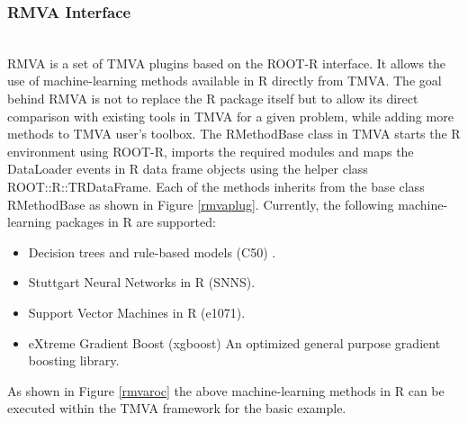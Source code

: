 \documentclass[a4paper]{jpconf}
\begin{document}
\subsubsection{RMVA Interface}\label{RMVA}\hspace*{\fill} \\
RMVA is a set of TMVA plugins based on the ROOT-R interface. It allows the use of machine-learning methods available in R directly from TMVA. The goal behind RMVA is not to replace the R package itself but to allow its direct comparison with existing tools in TMVA for a given problem, while adding more methods to TMVA user’s toolbox.\newline\newline
The RMethodBase class in TMVA starts the R environment using ROOT-R, imports the required modules and maps the DataLoader events in R data frame objects using the helper class ROOT::R::TRDataFrame.
Each of the methods inherits from the base class RMethodBase as shown in Figure \ref{rmvaplug}. 
Currently, the following machine-learning packages in R are supported: 
\begin{itemize}  
\item Decision trees and rule-based models (C50) \cite{c50}.
\item Stuttgart Neural Networks in R (SNNS)\cite{rsnns}.
\item Support Vector Machines in R (e1071)\cite{e1071}.
\item eXtreme Gradient Boost (xgboost) An optimized general purpose gradient boosting library\cite{chen2015xgboost}.
\end{itemize}
As shown in Figure \ref{rmvaroc} the above machine-learning methods in R can be executed within the TMVA framework for the basic example.
\end{document}
